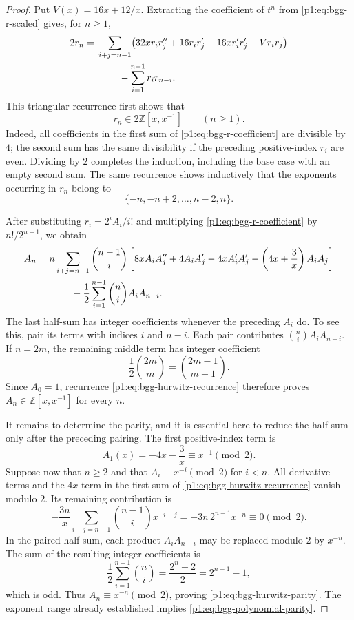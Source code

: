 \documentclass[11pt,a4paper]{article}
\theoremstyle{definition}
\theoremstyle{remark}
\numberwithin{equation}{section}
\begin{document}
\begin{proof}
Put $V(x)=16x+12/x$.  Extracting the coefficient of $t^n$ from
\eqref{p1:eq:bgg-r-scaled} gives, for $n\geq1$,
\begin{align}
 2r_n={}&
 \sum_{i+j=n-1}
 \bigl(32x r_i r_j''+16r_i r_j'
             -16x r_i'r_j'-V r_i r_j\bigr)
 \notag\\
 &\hspace{8mm}-\sum_{i=1}^{n-1}r_i r_{n-i}.
 \label{p1:eq:bgg-r-coefficient}
\end{align}
This triangular recurrence first shows that
\begin{equation}
 \label{p1:eq:bgg-r-even}
 r_n\in2\mathbb Z[x,x^{-1}]\qquad(n\geq1).
\end{equation}
Indeed, all coefficients in the first sum of
\eqref{p1:eq:bgg-r-coefficient} are divisible by $4$; the second sum has the
same divisibility if the preceding positive-index $r_i$ are even.  Dividing
by $2$ completes the induction, including the base case with an empty
second sum.  The same recurrence shows inductively that the exponents
occurring in $r_n$ belong to
\[
 \{-n,-n+2,\ldots,n-2,n\}.
\]

After substituting $r_i=2^i A_i/i!$ and multiplying
\eqref{p1:eq:bgg-r-coefficient} by $n!/2^{n+1}$, we obtain
\begin{align}
 A_n={}&n\sum_{i+j=n-1}\binom{n-1}{i}
 \left[
 8x A_i A_j''+4A_i A_j'-4x A_i'A_j'
 -\left(4x+\frac3x\right)A_i A_j
 \right]
 \notag\\
 &\hspace{8mm}-\frac12\sum_{i=1}^{n-1}\binom ni A_i A_{n-i}.
 \label{p1:eq:bgg-hurwitz-recurrence}
\end{align}
The last half-sum has integer coefficients whenever the preceding $A_i$
do.  To see this, pair its terms with indices $i$ and $n-i$.  Each pair
contributes $\binom ni A_i A_{n-i}$.  If $n=2m$, the remaining middle term
has integer coefficient
\[
 \frac12\binom{2m}{m}=\binom{2m-1}{m-1}.
\]
Since $A_0=1$, recurrence \eqref{p1:eq:bgg-hurwitz-recurrence} therefore proves
$A_n\in\mathbb Z[x,x^{-1}]$ for every $n$.

It remains to determine the parity, and it is essential here to reduce
the half-sum only after the preceding pairing.  The first positive-index
term is
\[
 A_1(x)=-4x-\frac3x\equiv x^{-1}\pmod2.
\]
Suppose now that $n\geq2$ and that
$A_i\equiv x^{-i}\pmod2$ for $i<n$.  All derivative terms and the $4x$
term in the first sum of \eqref{p1:eq:bgg-hurwitz-recurrence} vanish modulo
$2$.  Its remaining contribution is
\[
 -\frac{3n}{x}\sum_{i+j=n-1}\binom{n-1}{i}x^{-i-j}
 =-3n\,2^{n-1}x^{-n}\equiv0\pmod2.
\]
In the paired half-sum, each product $A_iA_{n-i}$ may be replaced modulo
$2$ by $x^{-n}$.  The sum of the resulting integer coefficients is
\[
 \frac12\sum_{i=1}^{n-1}\binom ni
 =\frac{2^n-2}{2}=2^{n-1}-1,
\]
which is odd.  Thus $A_n\equiv x^{-n}\pmod2$, proving
\eqref{p1:eq:bgg-hurwitz-parity}.  The exponent range already established
implies \eqref{p1:eq:bgg-polynomial-parity}.


\end{proof}
\end{document}
